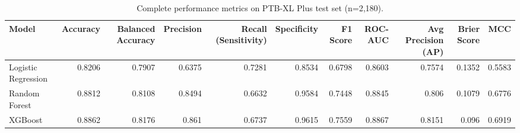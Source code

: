 \begin{table}[htbp]
  \centering
  \caption{Complete performance metrics on PTB-XL Plus test set (n=2,180).}
  \label{tab:p1_full_metrics}
  \begin{tabular}{lrrrrrrrrrr}
  \toprule
  Model & Accuracy & Balanced Accuracy & Precision & Recall (Sensitivity) & Specificity & F1 Score & ROC-AUC & Avg Precision (AP) & Brier Score & MCC \\
  \midrule
  Logistic Regression & 0.8206 & 0.7907 & 0.6375 & 0.7281 & 0.8534 & 0.6798 & 0.8603 & 0.7574 & 0.1352 & 0.5583 \\
  Random Forest & 0.8812 & 0.8108 & 0.8494 & 0.6632 & 0.9584 & 0.7448 & 0.8845 & 0.806 & 0.1079 & 0.6776 \\
  XGBoost & 0.8862 & 0.8176 & 0.861 & 0.6737 & 0.9615 & 0.7559 & 0.8867 & 0.8151 & 0.096 & 0.6919 \\
  \bottomrule
  \end{tabular}
\end{table}